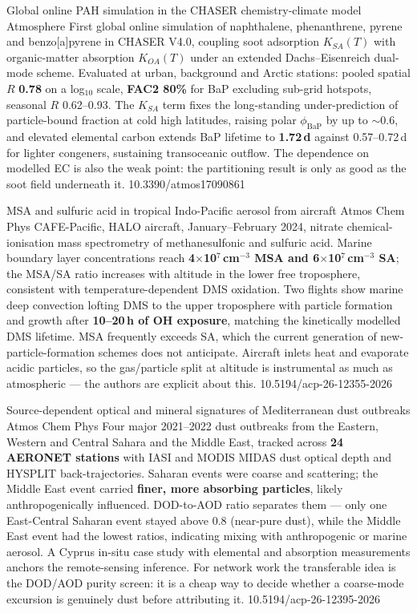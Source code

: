 \documentclass[10pt]{article}
\begin{document}
{Global online PAH simulation in the CHASER chemistry-climate model}
{Atmosphere}
{First global online simulation of naphthalene, phenanthrene, pyrene and benzo[a]pyrene in
CHASER V4.0, coupling soot adsorption $K_{SA}(T)$ with organic-matter absorption
$K_{OA}(T)$ under an extended Dachs--Eisenreich dual-mode scheme. Evaluated at urban,
background and Arctic stations: pooled spatial $R$ \textbf{0.78} on a log$_{10}$ scale,
\textbf{FAC2 80\%} for BaP excluding sub-grid hotspots, seasonal $R$ 0.62--0.93. The
$K_{SA}$ term fixes the long-standing under-prediction of particle-bound fraction at cold
high latitudes, raising polar $\phi_{\mathrm{BaP}}$ by up to $\sim$0.6, and elevated
elemental carbon extends BaP lifetime to \textbf{1.72\,d} against 0.57--0.72\,d for
lighter congeners, sustaining transoceanic outflow. The dependence on modelled EC is also
the weak point: the partitioning result is only as good as the soot field underneath it.}
{10.3390/atmos17090861}

{MSA and sulfuric acid in tropical Indo-Pacific aerosol from aircraft}
{Atmos Chem Phys}
{CAFE-Pacific, HALO aircraft, January--February 2024, nitrate chemical-ionisation mass
spectrometry of methanesulfonic and sulfuric acid. Marine boundary layer concentrations
reach \textbf{4$\times$10$^7$\,cm$^{-3}$ MSA and 6$\times$10$^7$\,cm$^{-3}$ SA}; the
MSA/SA ratio increases with altitude in the lower free troposphere, consistent with
temperature-dependent DMS oxidation. Two flights show marine deep convection lofting DMS
to the upper troposphere with particle formation and growth after \textbf{10--20\,h of OH
exposure}, matching the kinetically modelled DMS lifetime. MSA frequently exceeds SA,
which the current generation of new-particle-formation schemes does not anticipate.
Aircraft inlets heat and evaporate acidic particles, so the gas/particle split at altitude
is instrumental as much as atmospheric --- the authors are explicit about this.}
{10.5194/acp-26-12355-2026}

{Source-dependent optical and mineral signatures of Mediterranean dust outbreaks}
{Atmos Chem Phys}
{Four major 2021--2022 dust outbreaks from the Eastern, Western and Central Sahara and the
Middle East, tracked across \textbf{24 AERONET stations} with IASI and MODIS MIDAS dust
optical depth and HYSPLIT back-trajectories. Saharan events were coarse and scattering;
the Middle East event carried \textbf{finer, more absorbing particles}, likely
anthropogenically influenced. DOD-to-AOD ratio separates them --- only one East-Central
Saharan event stayed above 0.8 (near-pure dust), while the Middle East event had the
lowest ratios, indicating mixing with anthropogenic or marine aerosol. A Cyprus in-situ
case study with elemental and absorption measurements anchors the remote-sensing
inference. For network work the transferable idea is the DOD/AOD purity screen: it is a
cheap way to decide whether a coarse-mode excursion is genuinely dust before attributing
it.}
{10.5194/acp-26-12395-2026}
\end{document}
